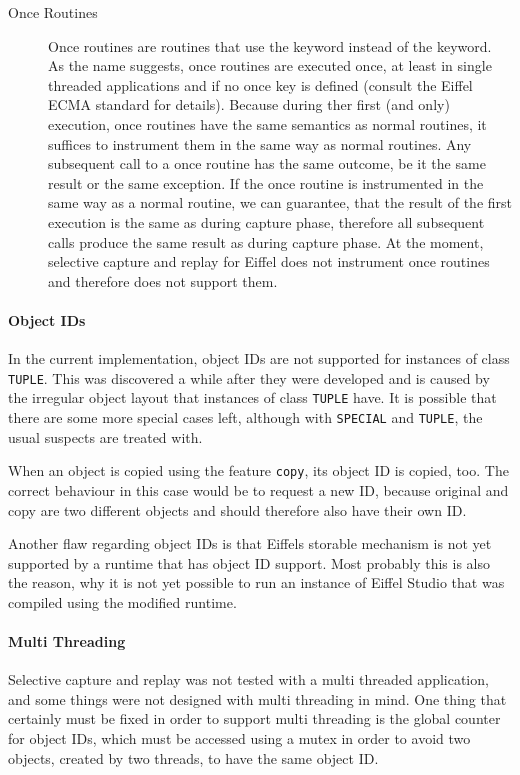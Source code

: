 \begin{description}
 \item [Once Routines] Once routines are routines that use the  keyword instead of the  keyword. As the name suggests, once routines are executed once, at least in single threaded applications and if no once key is defined (consult the Eiffel ECMA standard \cite{Eiffel-ECMA} for details). Because during ther first (and only) execution, once routines have the same semantics as normal routines, it suffices to instrument them in the same way as normal routines. Any subsequent call to a once routine has the same outcome, be it the same result or the same exception. If the once routine is instrumented in the same way as a normal routine, we can guarantee, that the result of the first execution is the same as during capture phase, therefore all subsequent calls produce the same result as during capture phase. At the moment, selective capture and replay for Eiffel does not instrument once routines and therefore does not support them.
\end{description}

\paragraph{Object IDs}
In the current implementation, object IDs are not supported for instances of class \texttt{TUPLE}. This was discovered a while after they were developed and is caused by the irregular object layout that instances of class \texttt{TUPLE} have. It is possible that there are some more special cases left, although with \texttt{SPECIAL} and \texttt{TUPLE}, the usual suspects are treated with.

When an object is copied using the feature \texttt{copy}, its object ID is copied, too. The correct behaviour in this case would be to request a new ID, because original and copy are two different objects and should therefore also have their own ID.

Another flaw regarding object IDs is that Eiffels storable mechanism is not yet supported by a runtime that has object ID support. Most probably this is also the reason, why it is not yet possible to run an instance of Eiffel Studio that was compiled using the modified runtime.

\paragraph{Multi Threading}
Selective capture and replay was not tested with a multi threaded application, and some things were not designed with multi threading in mind. One thing that certainly must be fixed in order to support multi threading is the global counter for object IDs, which must be accessed using a mutex in order to avoid two objects, created by two threads, to have the same object ID.


